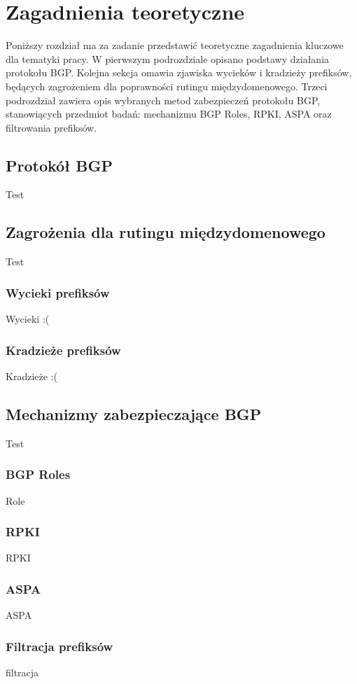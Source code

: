 \chapter{Zagadnienia teoretyczne}
\label{chapter-2}

Poniższy rozdział ma za zadanie przedstawić teoretyczne zagadnienia kluczowe dla tematyki pracy. W pierwszym podrozdziale opisano podstawy działania protokołu BGP. Kolejna sekcja omawia zjawiska wycieków i kradzieży prefiksów, będących zagrożeniem dla poprawności rutingu międzydomenowego. Trzeci podrozdział zawiera opis wybranych metod zabezpieczeń protokołu BGP, stanowiących przedmiot badań: mechanizmu BGP Roles, RPKI, ASPA oraz filtrowania prefiksów.

\section{Protokół BGP}

Test

\section{Zagrożenia dla rutingu międzydomenowego}

Test

\subsection{Wycieki prefiksów}

Wycieki :(

\subsection{Kradzieże prefiksów}

Kradzieże :(

\section{Mechanizmy zabezpieczające BGP}

Test

\subsection{BGP Roles}

Role

\subsection{RPKI}

RPKI

\subsection{ASPA}

ASPA

\subsection{Filtracja prefiksów}

filtracja